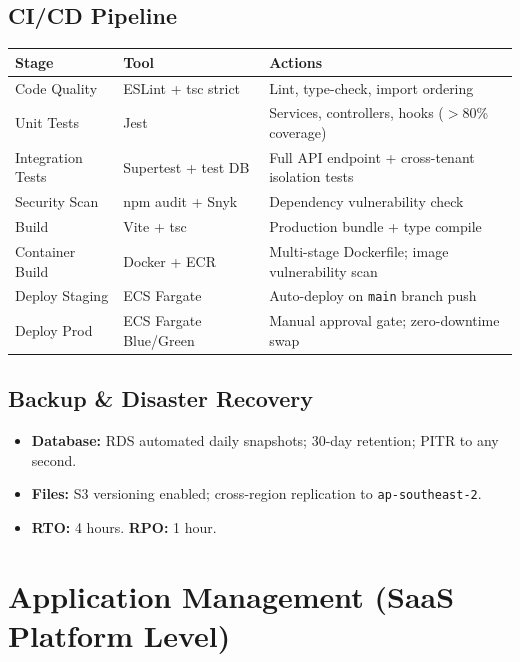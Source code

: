 \documentclass[12pt,a4paper]{report}
\begin{document}
\section{CI/CD Pipeline}

\begin{longtable}{L{3cm} L{4cm} L{7cm}}
\toprule
\textbf{Stage} & \textbf{Tool} & \textbf{Actions} \\\midrule\endhead\bottomrule\endfoot
Code Quality     & ESLint + tsc strict    & Lint, type-check, import ordering \\
Unit Tests       & Jest                   & Services, controllers, hooks ($>$80\% coverage) \\
Integration Tests & Supertest + test DB   & Full API endpoint + cross-tenant isolation tests \\
Security Scan    & npm audit + Snyk       & Dependency vulnerability check \\
Build            & Vite + tsc             & Production bundle + type compile \\
Container Build  & Docker + ECR           & Multi-stage Dockerfile; image vulnerability scan \\
Deploy Staging   & ECS Fargate            & Auto-deploy on \texttt{main} branch push \\
Deploy Prod      & ECS Fargate Blue/Green & Manual approval gate; zero-downtime swap \\
\end{longtable}

\section{Backup \& Disaster Recovery}

\begin{itemize}
  \item \textbf{Database:} RDS automated daily snapshots; 30-day retention; PITR to any second.
  \item \textbf{Files:} S3 versioning enabled; cross-region replication to \texttt{ap-southeast-2}.
  \item \textbf{RTO:} 4 hours. \textbf{RPO:} 1 hour.
\end{itemize}

\chapter{Application Management (SaaS Platform Level)}
\end{document}
